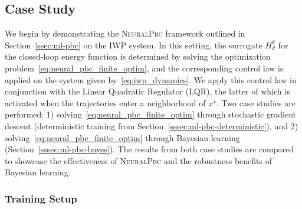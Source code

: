 

\subsection{Case Study}

We begin by demonstrating the \textsc{NeuralPbc} framework outlined in
Section~\ref{ssec:ml-pbc} on the IWP system. 
%
In this setting, the surrogate $H_d^\theta$ for the closed-loop energy function
is determined by solving the optimization
problem~\eqref{eq:neural_pbc_finite_optim}, and the corresponding control law is
applied on the system given by~\eqref{eq:iwp_dynamics}.
%
We apply this control law in conjunction with the Linear Quadratic Regulator
(LQR), the latter of which is activated when the trajectories enter a
neighborhood of $x^\star$.
%
Two case studies are performed: 1) solving~\eqref{eq:neural_pbc_finite_optim}
through stochastic gradient descent (deterministic training from
Section~\ref{sssec:ml-pbc-deterministic}), and 2)
solving~\eqref{eq:neural_pbc_finite_optim} through Bayesian learning
(Section~\ref{sssec:ml-pbc-bayes}).
%
The results from both case studies are compared to showcase the effectiveness of
\textsc{NeuralPbc} and the robustness benefits of Bayesian learning.


\subsubsection{Training Setup}

